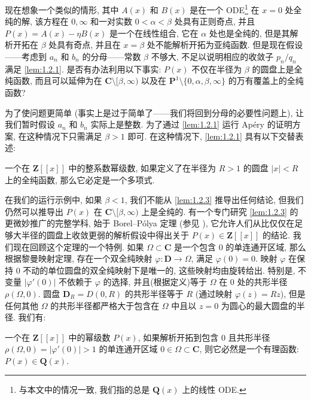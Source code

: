 现在想象一个类似的情形, 其中 $A(x)$ 和 $B(x)$ 是在一个 ODE\footnote{与本文中的情况一致, 我们指的总是 $\mathbf{Q}(x)$ 上的线性 ODE.} 在 $x=0$ 处全纯的解, 
该方程在 $0, \infty$ 和一对实数 $0 < \alpha < \beta$ 处具有正则奇点,
并且 $P(x) = A(x) - \eta B(x)$ 是一个在线性组合, 它在 $\alpha$ 处也是全纯的, 
但是其解析开拓在 $\beta$ 处具有奇点, 并且在 $x=\beta$ 处不能解析开拓为亚纯函数.
但是现在假设——考虑到 $a_n$ 和 $b_n$ 的分母——常数 $\beta$ 不够大, 
不足以说明相应的收敛子 $p_n/q_n$ 满足 \autoref{lem:1.2.1}.
是否有办法利用以下事实: $P(x)$ 不仅在半径为 $\beta$ 的圆盘上是全纯函数, 
而且可以延伸为在 $\mathbf{C} \setminus [\beta, \infty)$ 以及在 $\mathbf{P}^1 \setminus \{0, \alpha, \beta, \infty\}$ 的万有覆盖上的全纯函数?

为了使问题更简单 (事实上是过于简单了——我们将回到分母的必要性问题上), 
让我们暂时假设 $a_n$ 和 $b_n$ 实际上是整数.
为了通过 \autoref{lem:1.2.1} 运行 Ap{\'e}ry 的证明方案, 在这种情况下只需满足 $\beta > 1$ 即可.
在这种情况下, \autoref{lem:1.2.1} 具有以下交替表述:

\begin{lemma}\label{lem:1.2.3}
一个在 $\mathbf{Z}[\![x]\!]$ 中的整系数幂级数, 如果定义了在半径为 $R > 1$ 的圆盘 $|x| < R$ 上的全纯函数, 那么它必定是一个多项式.
\end{lemma}

在我们的运行示例中, 如果 $\beta < 1$, 我们不能从 \autoref{lem:1.2.3} 推导出任何结论, 
但我们仍然可以推导出 $P(x)$ 在 $\mathbf{C} \setminus [\beta, \infty)$ 上是全纯的.
有一个专门研究 \autoref{lem:1.2.3} 的更微妙推广的完整学科, 
始于 Borel--P{\'o}lya 定理 (参见 \cite[Chapter 5]{Ami75}), 
它允许人们从比仅仅在足够大半径的圆盘上收敛更弱的解析假设中得出关于 $P(x) \in \mathbf{Z}[\![x]\!]$ 的结论.
我们现在回顾这个定理的一个特例.
如果 $\Omega \subset \mathbf{C}$ 是一个包含 $0$ 的单连通开区域, 
那么根据黎曼映射定理, 存在一个双全纯映射 $\varphi : \mathbf{D} \to \Omega$, 满足 $\varphi(0) = 0$.
映射 $\varphi$ 在保持 $0$ 不动的单位圆盘的双全纯映射下是唯一的, 这些映射均由旋转给出.
特别是, 不变量 $|\varphi'(0)|$ 不依赖于 $\varphi$ 的选择, 
并且(根据定义)等于 $\Omega$ 在 $0$ 处的共形半径 $\rho(\Omega, 0)$.
圆盘 $\mathbf{D}_R = D(0, R)$ 的共形半径等于 $R$ (通过映射 $\varphi(z) = Rz$), 
但是任何其他 $\Omega$ 的共形半径都严格大于包含在 $\Omega$ 中且以 $z = 0$ 为圆心的最大圆盘的半径.
我们有:

\begin{theorem}\label{thm:1.2.4}
一个在 $\mathbf{Z}[\![x]\!]$ 中的幂级数 $P(x)$, 
如果解析开拓到包含 $0$ 且共形半径 $\rho(\Omega, 0) = |\varphi'(0)| > 1$ 的单连通开区域 $0 \in \Omega \subset \mathbf{C}$, 
则它必然是一个有理函数: $P(x) \in \mathbf{Q}(x)$.
\end{theorem}

